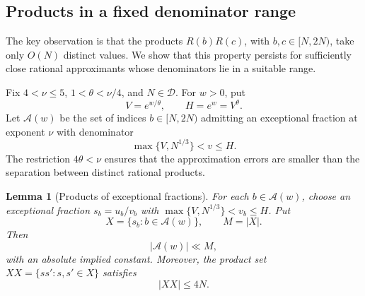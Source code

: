 \documentclass[11pt,reqno]{amsart}
\newtheorem{lemma}{Lemma}[section]
\theoremstyle{definition}
\newcommand{\DD}{\mathcal D}
\begin{document}
\subsection{Products in a fixed denominator range}

The key observation is that the products $R(b)R(c)$,
with $b,c\in[N,2N)$, take only $O(N)$ distinct values.
We show that this property persists for sufficiently
close rational approximants whose denominators lie
in a suitable range.

Fix $4<\nu\le5$, $1<\theta<\nu/4$, and $N\in\DD$.
For $w>0$, put
\[
 V=e^{w/\theta},\qquad H=e^w=V^\theta.
\]
Let $\mathcal A(w)$ be the set of indices $b\in[N,2N)$
admitting an exceptional fraction at exponent $\nu$
with denominator
\[
 \max\{V,N^{1/3}\}<v\le H.
\]
The restriction $4\theta<\nu$ ensures that the
approximation errors are smaller than the separation
between distinct rational products.

\begin{lemma}[Products of exceptional fractions]
\label{lem:products}
For each $b\in\mathcal A(w)$, choose an exceptional
fraction $s_b=u_b/v_b$ with
$\max\{V,N^{1/3}\}<v_b\le H$. Put
\[
 X=\{s_b:b\in\mathcal A(w)\},\qquad M=|X|.
\]
Then
\begin{equation}\label{eq:multiplicity}
 |\mathcal A(w)|\ll M,
\end{equation}
with an absolute implied constant. Moreover, the
product set $XX=\{ss':s,s'\in X\}$ satisfies
\begin{equation}\label{eq:products}
 |XX|\le4N.
\end{equation}
\end{lemma}
\end{document}
